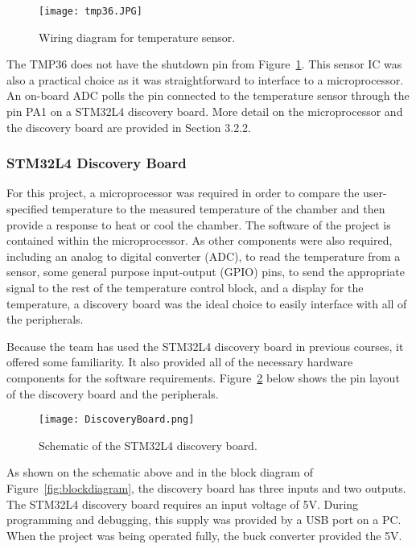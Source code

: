 \documentclass[11pt,letter]{article}
\begin{document}
\begin{figure}[H]
    \centering
    \texttt{[image: tmp36.JPG]}
    \caption{Wiring diagram for temperature sensor.}
    \label{fig:tempsensor}
\end{figure}

The TMP36 does not have the shutdown pin from Figure~\ref{fig:tempsensor}. This sensor IC was also a practical choice as it was straightforward to interface to a microprocessor. An on-board ADC polls the pin connected to the temperature sensor through the pin PA1 on a STM32L4 discovery board. More detail on the microprocessor and the discovery board are provided in Section 3.2.2.

\subsubsection{STM32L4 Discovery Board}

For this project, a microprocessor was required in order to compare the user-specified temperature to the measured temperature of the chamber and then provide a response to heat or cool the chamber. The software of the project is contained within the microprocessor. As other components were also required, including an analog to digital converter (ADC), to read the temperature from a sensor, some general purpose input-output (GPIO) pins, to send the appropriate signal to the rest of the temperature control block, and a display for the temperature, a discovery board was the ideal choice to easily interface with all of the peripherals.

Because the team has used the STM32L4 discovery board in previous courses, it offered some familiarity. It also provided all of the necessary hardware components for the software requirements. Figure~\ref{fig:discovery} below shows the pin layout of the discovery board and the peripherals.

\begin{figure}[H]
    \centering
    \texttt{[image: DiscoveryBoard.png]}
    \caption{Schematic of the STM32L4 discovery board.}
    \label{fig:discovery}
\end{figure}

As shown on the schematic above and in the block diagram of Figure~\ref{fig:blockdiagram}, the discovery board has three inputs and two outputs. The STM32L4 discovery board requires an input voltage of 5V. During programming and debugging, this supply was provided by a USB port on a PC. When the project was being operated fully, the buck converter provided the 5V. 
\end{document}
